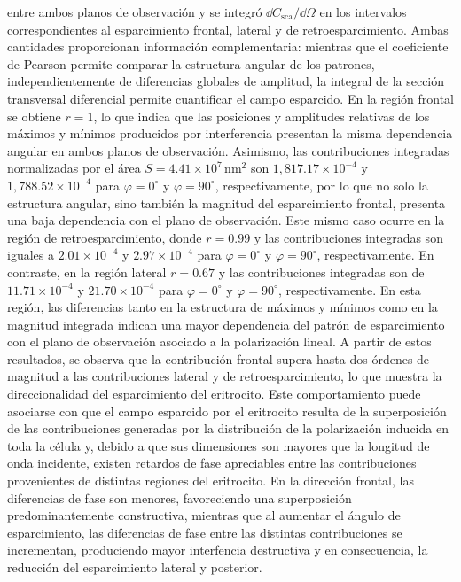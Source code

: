entre ambos planos de observación y se integró $\dd{C_{\text{sca}}}/\dd{\Omega}$ en los intervalos correspondientes al esparcimiento frontal, lateral y de retroesparcimiento. Ambas cantidades proporcionan información complementaria: mientras que el coeficiente de Pearson permite comparar la estructura angular de los patrones, independientemente de diferencias globales de amplitud, la integral de la sección transversal diferencial permite cuantificar el campo esparcido. En la región frontal se obtiene $r=1$, lo que indica que las posiciones y amplitudes relativas de los máximos y mínimos producidos por interferencia presentan la misma dependencia angular en ambos planos de observación. Asimismo, las contribuciones integradas normalizadas por el área $S=4.41\times 10^{7}\,\text{nm}^2$ son $1,817.17\times 10^{-4}$ y $1,788.52\times 10^{-4}$ para $\varphi=0^{\circ}$ y $\varphi=90^{\circ}$, respectivamente, por lo que no solo la estructura angular, sino también la magnitud del esparcimiento frontal, presenta una baja dependencia con el plano de observación.  Este mismo caso ocurre en la región de retroesparcimiento, donde $r=0.99$ y las contribuciones integradas son iguales a $2.01\times 10^{-4}$ y $2.97\times 10^{-4}$ para $\varphi=0^{\circ}$ y $\varphi=90^{\circ}$, respectivamente. En contraste, en la región lateral $r= 0.67$ y las contribuciones integradas son de $11.71\times 10^{-4}$ y $21.70\times 10^{-4}$ para $\varphi=0^{\circ}$ y $\varphi=90^{\circ}$, respectivamente. En esta región, las diferencias tanto en la estructura de máximos y mínimos como en la magnitud integrada indican una mayor dependencia del patrón de esparcimiento con el plano de observación asociado a la polarización lineal. A partir de estos resultados, se observa que la contribución frontal supera hasta dos órdenes de magnitud a las contribuciones lateral y de retroesparcimiento, lo que muestra la direccionalidad del esparcimiento del eritrocito. Este comportamiento puede asociarse con que el campo esparcido por el eritrocito resulta de la superposición de las contribuciones generadas por la distribución de la polarización inducida en toda la célula y, debido a que sus dimensiones son mayores que la longitud de onda incidente, existen retardos de fase apreciables entre las contribuciones provenientes de distintas regiones del eritrocito. En la dirección frontal, las diferencias de fase son menores, favoreciendo una superposición predominantemente constructiva, mientras que al aumentar el ángulo de esparcimiento, las diferencias de fase entre las distintas contribuciones se incrementan, produciendo mayor interfencia destructiva y en consecuencia, la reducción del esparcimiento lateral y posterior.
	
